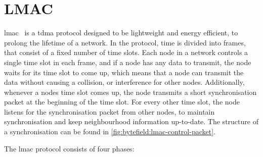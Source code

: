 \section{LMAC}\label{sec:lmacc}
\gls{lmac}~\cite{paper:lmac_protocol}\cite{paper:lmac_verification} is a \gls{tdma} protocol designed to be
lightweight and energy efficient, to prolong the lifetime of a network. In the protocol, time is
divided into frames, that consist of a fixed number of time slots. Each node in a network controls a single
time slot in each frame, and if a node has any data to transmit, the node waits for its time slot to come up,
which means that a node can transmit the data without causing a collision, or interference for other
nodes. Additionally, whenever a nodes time slot comes up, the node transmits a short synchronisation packet
at the beginning of the time slot. For every other time slot, the node listens for the synchronisation packet
from other nodes, to maintain synchronisation and keep neighbourhood information up-to-date. The structure of
a synchronisation can be found in \autoref{fig:bytefield:lmac-control-packet}. \medbreak

The \gls{lmac} protocol consists of four phases:

